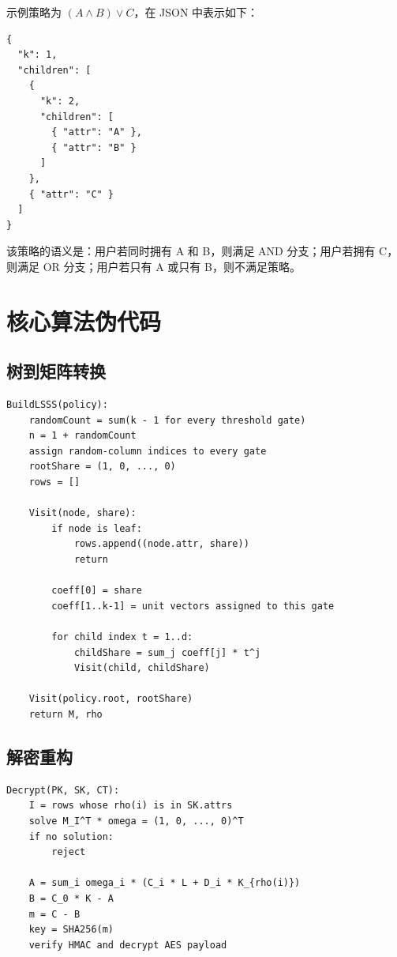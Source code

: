 示例策略为 $(A\wedge B)\vee C$，在 JSON 中表示如下：

\begin{lstlisting}[caption={示例访问控制树 JSON}]
{
  "k": 1,
  "children": [
    {
      "k": 2,
      "children": [
        { "attr": "A" },
        { "attr": "B" }
      ]
    },
    { "attr": "C" }
  ]
}
\end{lstlisting}

该策略的语义是：用户若同时拥有 A 和 B，则满足 AND 分支；用户若拥有 C，则满足 OR 分支；用户若只有 A 或只有 B，则不满足策略。

\section{核心算法伪代码}

\subsection{树到矩阵转换}

\begin{lstlisting}[caption={访问控制树到 LSSS 矩阵的伪代码}]
BuildLSSS(policy):
    randomCount = sum(k - 1 for every threshold gate)
    n = 1 + randomCount
    assign random-column indices to every gate
    rootShare = (1, 0, ..., 0)
    rows = []

    Visit(node, share):
        if node is leaf:
            rows.append((node.attr, share))
            return

        coeff[0] = share
        coeff[1..k-1] = unit vectors assigned to this gate

        for child index t = 1..d:
            childShare = sum_j coeff[j] * t^j
            Visit(child, childShare)

    Visit(policy.root, rootShare)
    return M, rho
\end{lstlisting}

\subsection{解密重构}

\begin{lstlisting}[caption={解密阶段线性重构的伪代码}]
Decrypt(PK, SK, CT):
    I = rows whose rho(i) is in SK.attrs
    solve M_I^T * omega = (1, 0, ..., 0)^T
    if no solution:
        reject

    A = sum_i omega_i * (C_i * L + D_i * K_{rho(i)})
    B = C_0 * K - A
    m = C - B
    key = SHA256(m)
    verify HMAC and decrypt AES payload
\end{lstlisting}

